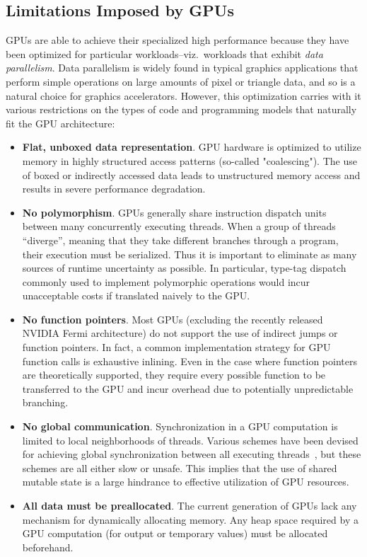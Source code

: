 \documentclass[preprint]{sigplanconf}
\begin{document}
\subsection{Limitations Imposed by GPUs}
\label{GPULimitations}
GPUs are able to achieve their specialized high performance because they have
been optimized for particular workloads--viz.~workloads that exhibit \emph{data
parallelism}.  Data parallelism is widely found in typical graphics applications
that perform simple operations on large amounts of pixel or triangle data, and
so is a natural choice for graphics accelerators.  However, this optimization
carries with it various restrictions on the types of code and programming models
that naturally fit the GPU architecture:

\begin{itemize}
\item \textbf{Flat, unboxed data representation}. GPU hardware is optimized to
utilize memory in highly structured access patterns (so-called "coalescing"). 
The use of boxed or indirectly accessed data leads to unstructured memory access
and results in severe performance degradation.

\item \textbf{No polymorphism}. GPUs generally share instruction dispatch units
between many concurrently executing threads. When a group of threads
``diverge'', meaning that they take different branches through a program, their
execution must be serialized. Thus it is important to eliminate as many sources
of runtime uncertainty as possible. In particular, type-tag dispatch commonly
used to implement polymorphic operations would incur unacceptable costs if
translated naively to the GPU.

\item \textbf {No function pointers}. Most GPUs (excluding the recently released
NVIDIA Fermi architecture) do not support the use of indirect jumps or function
pointers. In fact, a common implementation strategy for GPU function calls is
exhaustive inlining. Even in the case where function pointers are theoretically
supported, they require every possible function to be transferred to the GPU and
incur overhead due to potentially unpredictable branching. 

\item \textbf{No global communication}. Synchronization in a GPU computation is
limited to local neighborhoods of threads. Various schemes have been devised for
achieving global synchronization between all executing threads~\cite{feng10},
but these schemes are all either slow or unsafe. This implies that the use of
shared mutable state is a large hindrance to effective utilization of GPU
resources.

\item \textbf{All data must be preallocated}. The current generation of GPUs
lack any mechanism for dynamically allocating memory. Any heap space required by
a GPU computation (for output or temporary values) must be allocated
beforehand. 
\end{itemize}
\end{document}
